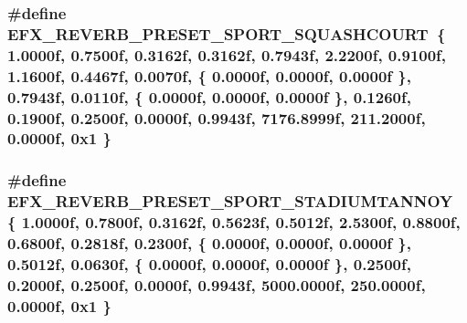 \subsubsection[{\texorpdfstring{E\+F\+X\+\_\+\+R\+E\+V\+E\+R\+B\+\_\+\+P\+R\+E\+S\+E\+T\+\_\+\+S\+P\+O\+R\+T\+\_\+\+S\+Q\+U\+A\+S\+H\+C\+O\+U\+RT}{EFX_REVERB_PRESET_SPORT_SQUASHCOURT}}]{\setlength{\rightskip}{0pt plus 5cm}\#define E\+F\+X\+\_\+\+R\+E\+V\+E\+R\+B\+\_\+\+P\+R\+E\+S\+E\+T\+\_\+\+S\+P\+O\+R\+T\+\_\+\+S\+Q\+U\+A\+S\+H\+C\+O\+U\+RT~\{ 1.\+0000f, 0.\+7500f, 0.\+3162f, 0.\+3162f, 0.\+7943f, 2.\+2200f, 0.\+9100f, 1.\+1600f, 0.\+4467f, 0.\+0070f, \{ 0.\+0000f, 0.\+0000f, 0.\+0000f \}, 0.\+7943f, 0.\+0110f, \{ 0.\+0000f, 0.\+0000f, 0.\+0000f \}, 0.\+1260f, 0.\+1900f, 0.\+2500f, 0.\+0000f, 0.\+9943f, 7176.\+8999f, 211.\+2000f, 0.\+0000f, 0x1 \}}\hypertarget{efx-presets_8h_a25bb269e5c8e3bed033ba116fb4990e8}{}\label{efx-presets_8h_a25bb269e5c8e3bed033ba116fb4990e8}
\subsubsection[{\texorpdfstring{E\+F\+X\+\_\+\+R\+E\+V\+E\+R\+B\+\_\+\+P\+R\+E\+S\+E\+T\+\_\+\+S\+P\+O\+R\+T\+\_\+\+S\+T\+A\+D\+I\+U\+M\+T\+A\+N\+N\+OY}{EFX_REVERB_PRESET_SPORT_STADIUMTANNOY}}]{\setlength{\rightskip}{0pt plus 5cm}\#define E\+F\+X\+\_\+\+R\+E\+V\+E\+R\+B\+\_\+\+P\+R\+E\+S\+E\+T\+\_\+\+S\+P\+O\+R\+T\+\_\+\+S\+T\+A\+D\+I\+U\+M\+T\+A\+N\+N\+OY~\{ 1.\+0000f, 0.\+7800f, 0.\+3162f, 0.\+5623f, 0.\+5012f, 2.\+5300f, 0.\+8800f, 0.\+6800f, 0.\+2818f, 0.\+2300f, \{ 0.\+0000f, 0.\+0000f, 0.\+0000f \}, 0.\+5012f, 0.\+0630f, \{ 0.\+0000f, 0.\+0000f, 0.\+0000f \}, 0.\+2500f, 0.\+2000f, 0.\+2500f, 0.\+0000f, 0.\+9943f, 5000.\+0000f, 250.\+0000f, 0.\+0000f, 0x1 \}}\hypertarget{efx-presets_8h_afbd61a4687adf060ebc6a26aa6018671}{}\label{efx-presets_8h_afbd61a4687adf060ebc6a26aa6018671}
